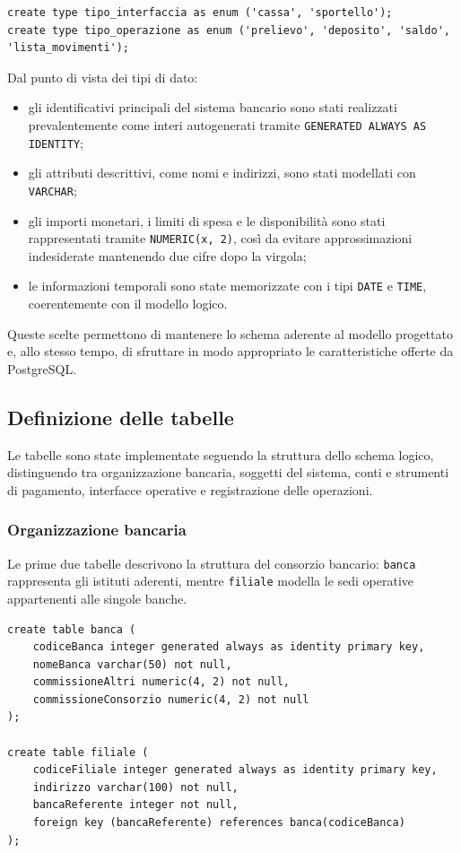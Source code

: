 \begin{lstlisting}[caption={Definizione dei tipi enumerativi}]
create type tipo_interfaccia as enum ('cassa', 'sportello');
create type tipo_operazione as enum ('prelievo', 'deposito', 'saldo', 'lista_movimenti');
\end{lstlisting}

Dal punto di vista dei tipi di dato:
\begin{itemize}
    \item gli identificativi principali del sistema bancario sono stati realizzati prevalentemente come interi autogenerati tramite \texttt{GENERATED ALWAYS AS IDENTITY};
    \item gli attributi descrittivi, come nomi e indirizzi, sono stati modellati con \texttt{VARCHAR};
    \item gli importi monetari, i limiti di spesa e le disponibilità sono stati rappresentati tramite \texttt{NUMERIC(x, 2)}, così da evitare approssimazioni indesiderate mantenendo due cifre dopo la virgola;
    \item le informazioni temporali sono state memorizzate con i tipi \texttt{DATE} e \texttt{TIME}, coerentemente con il modello logico.
\end{itemize}

Queste scelte permettono di mantenere lo schema aderente al modello progettato e, allo stesso tempo, di sfruttare in modo appropriato le caratteristiche offerte da PostgreSQL.

\subsection{Definizione delle tabelle}
Le tabelle sono state implementate seguendo la struttura dello schema logico, distinguendo tra organizzazione bancaria, soggetti del sistema, conti e strumenti di pagamento, interfacce operative e registrazione delle operazioni.

\subsubsection{Organizzazione bancaria}
Le prime due tabelle descrivono la struttura del consorzio bancario: \texttt{banca} rappresenta gli istituti aderenti, mentre \texttt{filiale} modella le sedi operative appartenenti alle singole banche.

\begin{lstlisting}[caption={Tabelle banca e filiale}]
create table banca (
    codiceBanca integer generated always as identity primary key,
    nomeBanca varchar(50) not null,
    commissioneAltri numeric(4, 2) not null,
    commissioneConsorzio numeric(4, 2) not null
);

create table filiale (
    codiceFiliale integer generated always as identity primary key,
    indirizzo varchar(100) not null,
    bancaReferente integer not null,
    foreign key (bancaReferente) references banca(codiceBanca)
);
\end{lstlisting}

